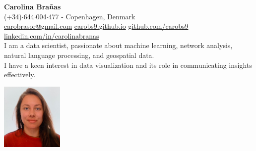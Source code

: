 \documentclass{resume}
\begin{document}
\vspace{-2em}
\begin{minipage}{0.75\textwidth}
    \raggedright
    {\Huge \textbf{Carolina Brañas}}\\[0.5em] 
    {\small
    (+34)$\cdot$644$\cdot$004$\cdot$477 - Copenhagen, Denmark\\
    \href{mailto://carobrasor@gmail.com}{carobrasor@gmail.com} \quad
    \href{https://carobs9.github.io/}{carobs9.github.io} \quad
    \href{https://github.com/carobs9}{github.com/carobs9} \quad
    \href{https://www.linkedin.com/in/carolinabranas/}{linkedin.com/in/carolinabranas} \quad
    }\\[1em]
    I am a data scientist, passionate about machine learning, network analysis, natural language processing, and geospatial data. \\
    I have a keen interest in data visualization and its role in communicating insights effectively.
\end{minipage}%
\hfill
\begin{minipage}{0.23\textwidth}
    \begin{flushright}
        \includegraphics[width=3cm]{profile.jpg}
    \end{flushright}
\end{minipage}
\vspace{1em}

\end{document}
